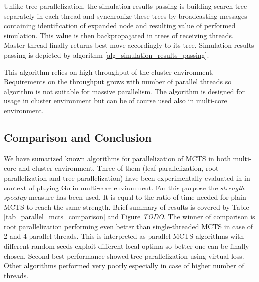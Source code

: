Unlike tree parallelization, the simulation results passing is building search tree separately in
each thread and synchronize these trees by broadcasting messages containing identification of
expanded node and resulting value of performed simulation. This value is then backpropagated in
trees of receiving threads. Master thread finally returns best move accordingly to its tree.
Simulation results passing is depicted by algorithm \ref{alg_simulation_results_passing}.

This algorithm relies on high throughput of the cluster environment. Requirements on the throughput
grows with number of parallel threads so algorithm is not suitable for massive parallelism. The
algorithm is designed for usage in cluster environment but can be of course used also in multi-core
environment.


\subsection{Comparison and Conclusion}

We have sumarized known algorithms for parallelization of MCTS in both multi-core and cluster
environment. Three of them (leaf parallelization, root parallelization and tree
parallelization)
have been experimentally evaluated in \cite{Chaslot2008} in context of playing Go in multi-core
environment. For this purpose the \emph{strength speedup} measure has been used. It is equal to
 the ratio of time needed for plain
MCTS to reach the same strength. Brief summary of results is covered by Table
\ref{tab_parallel_mcts_comparison} and Figure \emph{TODO}. The winner of comparison is root parallelization performing even
better than single-threaded MCTS in case of 2 and 4 parallel threads. This is interpreted as 
parallel MCTS algorithms with different random seeds exploit different local optima so better one
can be finally chosen. Second best performance showed tree parallelization using virtual loss. Other
algorithms performed very poorly especially in case of higher number of threads.


